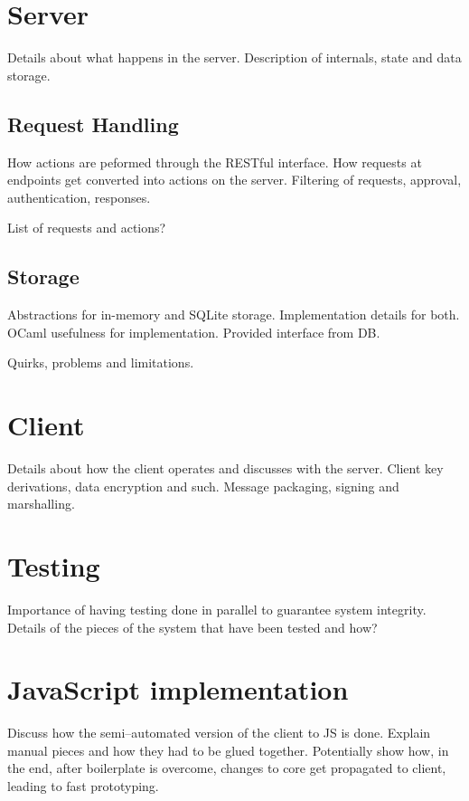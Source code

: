 \section{Server}
Details about what happens in the server.
Description of internals, state and data storage.

\subsection{Request Handling}
How actions are peformed through the RESTful interface.
How requests at endpoints get converted into actions on the server.
Filtering of requests, approval, authentication, responses.

List of requests and actions?

\subsection{Storage}
Abstractions for in-memory and SQLite storage.
Implementation details for both.
OCaml usefulness for implementation.
Provided interface from DB.

Quirks, problems and limitations.

\section{Client}
Details about how the client operates and discusses with the server.
Client key derivations, data encryption and such.
Message packaging, signing and marshalling.

\section{Testing}
Importance of having testing done in parallel to guarantee system integrity.
Details of the pieces of the system that have been tested and how?

\section{JavaScript implementation}
Discuss how the semi--automated version of the client to JS is done.
Explain manual pieces and how they had to be glued together.
Potentially show how, in the end, after boilerplate is overcome, changes to core get propagated to client, leading to fast prototyping.

